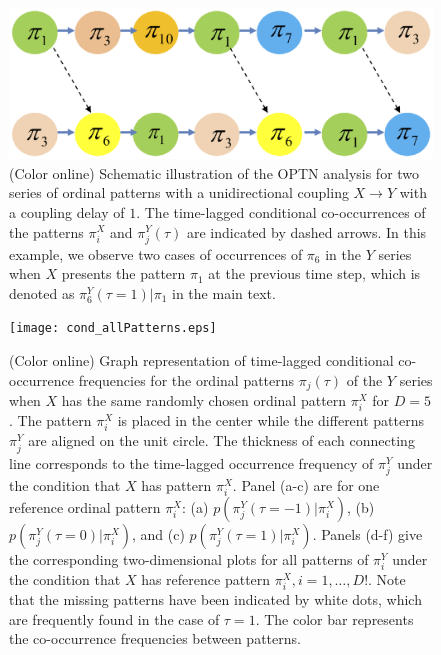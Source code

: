 \documentclass[12pt,aip,cha,reprint,nofootinbib]{revtex4-1}
\begin{document}
\begin{figure}
	\centering
	\includegraphics[width=\columnwidth]{patternSeriesCondition.eps}
\caption{(Color online) Schematic illustration of the OPTN analysis for two series of ordinal patterns with a unidirectional coupling $X \to Y$ with a coupling delay of $1$. The time-lagged conditional co-occurrences of the patterns $\pi_i^{X}$ and $\pi_{j}^{Y}(\tau)$ are indicated by dashed arrows. In this example, we observe two cases of occurrences of $\pi_6$ in the $Y$ series when $X$ presents the pattern $\pi_1$ at the previous time step, which is denoted as $\pi_{6}^{Y}(\tau=1) | \pi_{1}$ in the main text.  \label{fig:patternSeriesCond}}
\end{figure}

\begin{figure}
	\centering
 	\texttt{[image: cond\_allPatterns.eps]}
\caption{(Color online) Graph representation of time-lagged conditional co-occurrence frequencies for the ordinal patterns $\pi_{j}(\tau)$ of the $Y$ series when $X$ has the same randomly chosen ordinal pattern $\pi_i^{X}$ for $D = 5$. The pattern $\pi_i^{X}$ is placed in the center while the different patterns $\pi_{j}^{Y}$ are aligned on the unit circle. The thickness of each connecting line corresponds to the time-lagged occurrence frequency of $\pi_j^{Y}$ under the condition that $X$ has pattern $\pi_i^{X}$. Panel (a-c) are for one reference ordinal pattern $\pi_i^{X}$: (a) $p(\pi_{j}^{Y}(\tau=-1) | \pi_{i}^{X}) $, (b) $p(\pi_j^{Y}(\tau=0) | \pi_i^{X})$, and (c) $p(\pi_{j}^{Y}(\tau=1) | \pi_i^{X})$. Panels (d-f) give the corresponding two-dimensional plots for all patterns of $\pi_i^{Y}$ under the condition that $X$ has reference pattern $\pi_i^{X}, i = 1, \dots, D!$. Note that the missing patterns have been indicated by white dots, which are frequently found in the case of $\tau = 1$. The color bar represents the co-occurrence frequencies between patterns. 
\label{fig:conditionTranOP}}
\end{figure}
\end{document}

